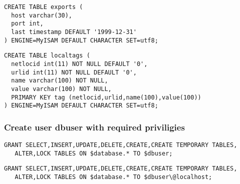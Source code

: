\begin{verbatim}
CREATE TABLE exports (
  host varchar(30),
  port int,
  last timestamp DEFAULT '1999-12-31'
) ENGINE=MyISAM DEFAULT CHARACTER SET=utf8;
\end{verbatim}

\begin{verbatim}
CREATE TABLE localtags (
  netlocid int(11) NOT NULL DEFAULT '0',
  urlid int(11) NOT NULL DEFAULT '0',
  name varchar(100) NOT NULL,
  value varchar(100) NOT NULL,
  PRIMARY KEY tag (netlocid,urlid,name(100),value(100))
) ENGINE=MyISAM DEFAULT CHARACTER SET=utf8;
\end{verbatim}

\subsubsection{Create user dbuser with required priviligies}
\begin{verbatim}
GRANT SELECT,INSERT,UPDATE,DELETE,CREATE,CREATE TEMPORARY TABLES,
   ALTER,LOCK TABLES ON $database.* TO $dbuser;
\end{verbatim}

\begin{verbatim}
GRANT SELECT,INSERT,UPDATE,DELETE,CREATE,CREATE TEMPORARY TABLES,
   ALTER,LOCK TABLES ON $database.* TO $dbuser\@localhost;
\end{verbatim}

